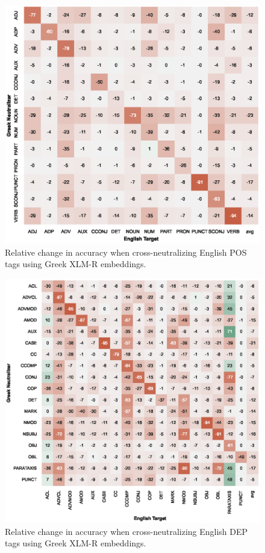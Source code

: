 \documentclass[11pt,a4paper]{article}
\begin{document}
\begin{figure}[t]
    \centering
    \includegraphics{full_figures/POS-crosslingual-en_gum_from_el_gdt-accdrop.eps}
    \caption{Relative change in accuracy when cross-neutralizing English POS tags using Greek XLM-R embeddings.}
    \label{fig:xlingual_xneutr_pos_en_gum_from_el_gdt}
\end{figure}

\begin{figure}[t]
    \centering
    \includegraphics{full_figures/DEP-crosslingual-en_gum_from_el_gdt-accdrop.eps}
    \caption{Relative change in accuracy when cross-neutralizing English DEP tags using Greek XLM-R embeddings.}
    \label{fig:xlingual_xneutr_dep_en_gum_from_el_gdt}
\end{figure}
\end{document}
